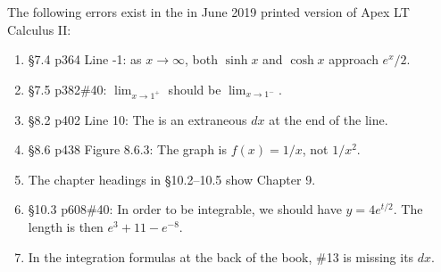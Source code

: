 \documentclass{amsart}
\newcommand{\ds}{\displaystyle}
\begin{document}
The following errors exist in the in June 2019 printed version of Apex LT Calculus II:
\begin{enumerate}
\item \S7.4 p364 Line -1: as $x\to\infty$, both $\sinh x$ and $\cosh x$ approach $e^x/2$.
\item \S7.5 p382\#40: $\ds\lim_{x\to1^+}$ should be $\ds\lim_{x\to1^-}$.
\item \S8.2 p402 Line 10: The is an extraneous $dx$ at the end of the line.
\item \S8.6 p438 Figure 8.6.3: The graph is $f(x)=1/x$, not $1/x^2$.
\item The chapter headings in \S10.2--10.5 show Chapter 9.
\item \S10.3 p608\#40: In order to be integrable, we should have $y=4e^{t/2}$.  The length is then $e^3+11-e^{-8}$.
\item In the integration formulas at the back of the book, \#13 is missing its $dx$.
\label{2019-06II}
\end{enumerate}
\end{document}
